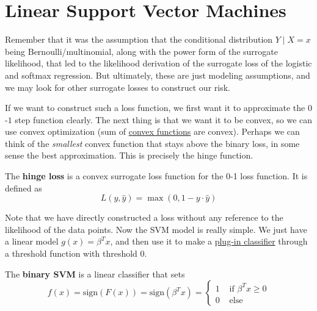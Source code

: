 \section{Linear Support Vector Machines} 

  Remember that it was the assumption that the conditional distribution $Y \mid X = x$ being Bernoulli/multinomial, along with the power form of the surrogate likelihood, that led to the likelihood derivation of the surrogate loss of the logistic and softmax regression. But ultimately, these are just modeling assumptions, and we may look for other surrogate losses to construct our risk. 

  If we want to construct such a loss function, we first want it to approximate the $0$-$1$ step function clearly. The next thing is that we want it to be convex, so we can use convex optimization (sum of \hyperref[mt-def:convex-function]{convex functions} are convex). Perhaps we can think of the \textit{smallest} convex function that stays above the binary loss, in some sense the best approximation. This is precisely the hinge function. 

  \begin{definition}
    \label{def:hinge-loss}
    The \textbf{hinge loss} is a convex surrogate loss function for the 0-1 loss function. It is defined as 
    \begin{equation}
      L(y, \hat{y}) = \max(0, 1 - y \cdot \hat{y})
    \end{equation}
  \end{definition} 

  Note that we have directly constructed a loss without any reference to the likelihood of the data points. Now the SVM model is really simple. We just have a linear model $g(x) = \beta^T x$, and then use it to make a \hyperref[def:plug-in-classifier]{plug-in classifier} through a threshold function with threshold $0$. 

  \begin{definition}
    \label{def:binary-support-vector-machine}
    The \textbf{binary SVM} is a linear classifier that sets 
    \begin{equation}
      f(x) = \mathrm{sign}(F(x)) = \mathrm{sign}(\beta^T x) = \begin{cases} 
        1 & \text{ if } \beta^T x \geq 0 \\
        0 & \text{ else}
      \end{cases}
    \end{equation}
  \end{definition} 

